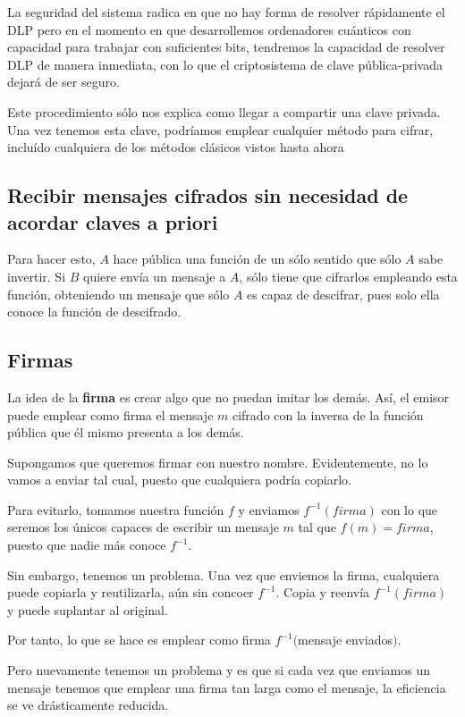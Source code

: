 La seguridad del sistema radica en que no hay forma de resolver rápidamente el DLP pero en el momento en que desarrollemos ordenadores cuánticos con capacidad para trabajar con suficientes bits, tendremos la capacidad de resolver DLP de manera inmediata, con lo que el criptosistema de clave pública-privada dejará de ser seguro.

Este procedimiento sólo nos explica como llegar a compartir una clave privada. Una vez tenemos esta clave, podríamos emplear cualquier método para cifrar, incluído cualquiera de los métodos clásicos vistos hasta ahora


\subsection{Recibir mensajes cifrados sin necesidad de acordar claves a priori}

Para hacer esto, $A$ hace pública una función de un sólo sentido que sólo $A$ sabe invertir. Si $B$ quiere envía un mensaje a $A$, sólo tiene que cifrarlos empleando esta función, obteniendo un mensaje que sólo $A$ es capaz de descifrar, pues solo ella conoce la función de descifrado.

\subsection{Firmas}

La idea de la \textbf{firma} es crear algo que no puedan imitar los demás. Así, el emisor puede emplear como firma el mensaje $m$ cifrado con la inversa de la función pública que él mismo presenta a los demás.

Supongamos que queremos firmar con nuestro nombre. Evidentemente, no lo vamos a enviar tal cual, puesto que cualquiera podría copiarlo.

Para evitarlo, tomamos nuestra función $f$ y enviamos $f^{-1}(firma)$ con lo que seremos los únicos capaces de escribir un mensaje $m$ tal que $f(m)=firma$, puesto que nadie más conoce $f^{-1}$.

Sin embargo, tenemos un problema. Una vez que enviemos la firma, cualquiera puede copiarla y reutilizarla, aún sin concoer $f^{-1}$. Copia y reenvía $f^{-1}(firma)$ y puede suplantar al original.

Por tanto, lo que se hace es emplear como firma $f^{-1}($mensaje enviados$)$.

Pero nuevamente tenemos un problema y es que si cada vez que enviamos un mensaje tenemos que emplear una firma tan larga como el mensaje, la eficiencia se ve drásticamente reducida.

